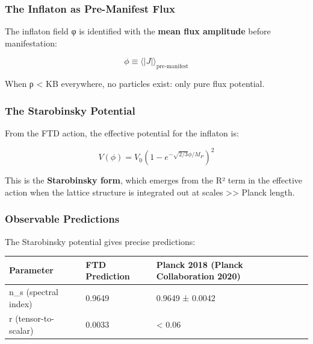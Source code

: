 \documentclass[
  11pt,
  letterpaper,
  twoside,
  openright]{book}
\begin{document}
\subsubsection{The Inflaton as Pre-Manifest
Flux}\label{the-inflaton-as-pre-manifest-flux}

The inflaton field φ is identified with the \textbf{mean flux amplitude}
before manifestation:

\[\phi \equiv \langle |J| \rangle_{\text{pre-manifest}}\]

When ρ \textless{} KB everywhere, no particles exist: only pure flux
potential.

\subsubsection{The Starobinsky
Potential}\label{the-starobinsky-potential}

From the FTD action, the effective potential for the inflaton is:

\[V(\phi) = V_0 \left(1 - e^{-\sqrt{2/3}\phi/M_P}\right)^2\]

This is the \textbf{Starobinsky form}, which emerges from the R² term in
the effective action when the lattice structure is integrated out at
scales \textgreater\textgreater{} Planck length.

\subsubsection{Observable Predictions}\label{observable-predictions}

The Starobinsky potential gives precise predictions:

\begin{longtable}[]{@{}lll@{}}
\toprule\noalign{}
Parameter & FTD Prediction & Planck 2018 (Planck Collaboration 2020) \\
\midrule\noalign{}
\endhead
\bottomrule\noalign{}
\endlastfoot
n\_s (spectral index) & 0.9649 & 0.9649 ± 0.0042 \\
r (tensor-to-scalar) & 0.0033 & \textless{} 0.06 \\
\end{longtable}
\end{document}
